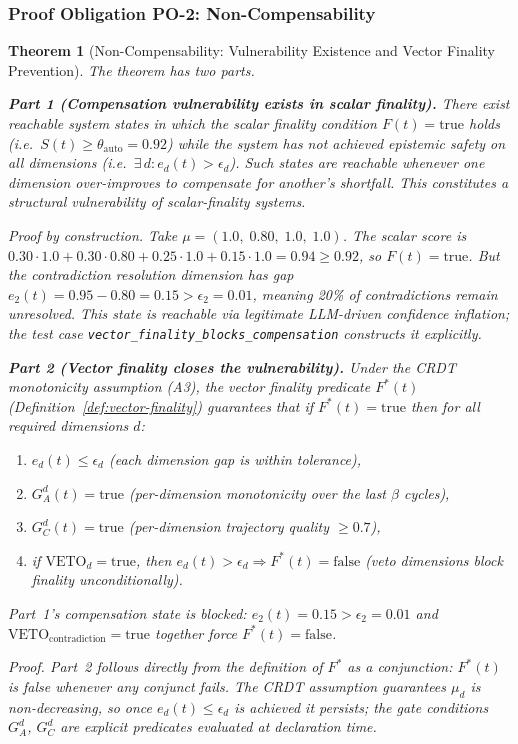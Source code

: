 \documentclass[11pt]{article}
\newtheorem{theorem}{Theorem}
\begin{document}
\subsubsection{Proof Obligation PO-2: Non-Compensability}

\begin{theorem}[Non-Compensability: Vulnerability Existence and Vector Finality Prevention]
\label{thm:vector-finality-soundness}
The theorem has two parts.

\textbf{Part 1 (Compensation vulnerability exists in scalar finality).}
There exist reachable system states in which the scalar finality condition $F(t) = \text{true}$ holds
(i.e.\ $S(t) \geq \theta_{\text{auto}} = 0.92$) while the system has not achieved epistemic safety on all
dimensions (i.e.\ $\exists\, d : e_d(t) > \epsilon_d$). Such states are reachable whenever one dimension
over-improves to compensate for another's shortfall. This constitutes a structural vulnerability of
scalar-finality systems.

\emph{Proof by construction.} Take $\mu = (1.0,\; 0.80,\; 1.0,\; 1.0)$. The scalar score is
$0.30 \cdot 1.0 + 0.30 \cdot 0.80 + 0.25 \cdot 1.0 + 0.15 \cdot 1.0 = 0.94 \geq 0.92$, so
$F(t) = \text{true}$. But the contradiction resolution dimension has gap $e_2(t) = 0.95 - 0.80 = 0.15
> \epsilon_2 = 0.01$, meaning 20\% of contradictions remain unresolved. This state is reachable via
legitimate LLM-driven confidence inflation; the test case \texttt{vector\_finality\_blocks\_compensation}
constructs it explicitly.

\textbf{Part 2 (Vector finality closes the vulnerability).}
Under the CRDT monotonicity assumption (A3), the vector finality predicate $F^*(t)$
(Definition~\ref{def:vector-finality}) guarantees that if $F^*(t) = \text{true}$ then for all
required dimensions $d$:
\begin{enumerate}
  \item $e_d(t) \leq \epsilon_d$ (each dimension gap is within tolerance),
  \item $G_A^d(t) = \text{true}$ (per-dimension monotonicity over the last $\beta$ cycles),
  \item $G_C^d(t) = \text{true}$ (per-dimension trajectory quality $\geq 0.7$),
  \item if $\mathrm{VETO}_d = \text{true}$, then $e_d(t) > \epsilon_d \Rightarrow F^*(t) = \text{false}$
  (veto dimensions block finality unconditionally).
\end{enumerate}
Part~1's compensation state is blocked: $e_2(t) = 0.15 > \epsilon_2 = 0.01$ and
$\mathrm{VETO}_{\text{contradiction}} = \text{true}$ together force $F^*(t) = \text{false}$.

\emph{Proof.} Part~2 follows directly from the definition of $F^*$ as a conjunction: $F^*(t)$ is
false whenever any conjunct fails. The CRDT assumption guarantees $\mu_d$ is non-decreasing, so once
$e_d(t) \leq \epsilon_d$ is achieved it persists; the gate conditions $G_A^d$, $G_C^d$ are explicit
predicates evaluated at declaration time.
\end{theorem}
\end{document}
